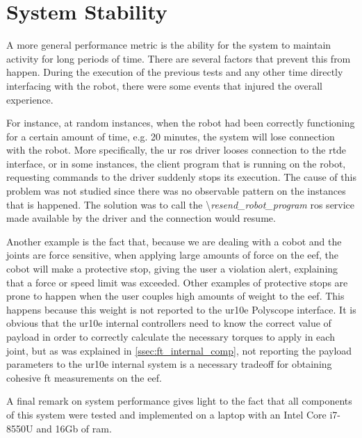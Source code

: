 


\section{System Stability}

\par A more general performance metric is the ability for the system to maintain activity for long periods of time. There are several factors that prevent this from happen. During the execution of the previous tests and any other time directly interfacing with the robot, there were some events that injured the overall experience.
\par For instance, at random instances, when the robot had been correctly functioning for a certain amount of time, e.g. 20 minutes, the system will lose connection with the robot. More specifically, the \ac{ur} \ac{ros} driver looses connection to the \ac{rtde} interface, or in some instances, the client program that is running on the robot, requesting commands to the driver suddenly stops its execution. The cause of this problem was not studied since there was no observable pattern on the instances that is happened. The solution was to call the \textbackslash\textit{resend\_robot\_program} \ac{ros} service made available by the driver and the connection would resume.
\par Another example is the fact that, because we are dealing with a cobot and the joints are force sensitive, when applying large amounts of force on the \ac{eef}, the cobot will make a protective stop, giving the user a violation alert, explaining that a force or speed limit was exceeded. Other examples of protective stops are prone to happen when the user couples high amounts of weight to the \ac{eef}. This happens because this weight is not reported to the \ac{ur10e} Polyscope interface. It is obvious that the \ac{ur10e} internal controllers need to know the correct value of payload in order to correctly calculate the necessary torques to apply in each joint, but as was explained in \autoref{ssec:ft_internal_comp}, not reporting the payload parameters to the \ac{ur10e} internal system is a necessary tradeoff for obtaining cohesive \ac{ft} measurements on the \ac{eef}.
\par A final remark on system performance gives light to the fact that all components of this system were tested and implemented on a laptop with an Intel Core i7-8550U and 16Gb of \acs{ram}. 